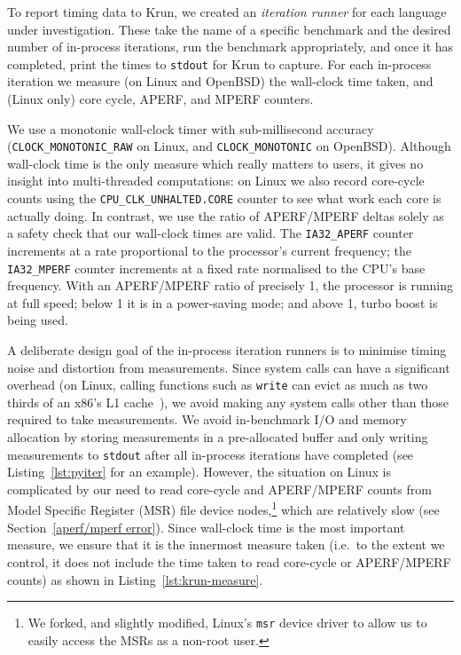\documentclass[acmsmall]{acmart}\settopmatter{printfolios=true}
\newcommand{\krun}{Krun\xspace}
\begin{document}
To report timing data to \krun, we created an
\emph{iteration runner} for each language under investigation.
These take the name of a specific benchmark and
the desired number of in-process iterations, run the benchmark appropriately,
and once it has completed, print the times to \texttt{stdout} for \krun to
capture. For each in-process iteration we
measure (on Linux and OpenBSD) the wall-clock time taken, and (Linux only) core
cycle, APERF, and MPERF counters.

We use a monotonic wall-clock timer with sub-millisecond accuracy
(\texttt{CLOCK\_MONOTONIC\_RAW} on Linux, and \texttt{CLOCK\-\_MONOTONIC} on
OpenBSD). Although wall-clock time is the only measure which really matters to
users, it gives no insight into multi-threaded computations: on Linux we also record
core-cycle counts using the \texttt{CPU\-\_CLK\-\_UNHALTED\-.CORE} counter to see
what work each core is actually doing. In contrast, we use the ratio of APERF/MPERF deltas
solely as a safety check that our wall-clock times are valid.
The \texttt{IA32\_APERF} counter increments at a rate proportional to the
processor's current frequency; the \texttt{IA32\_MPERF} counter increments at a fixed
rate normalised to the CPU's base frequency. With an APERF/MPERF ratio of
precisely 1, the processor is running at full speed; below 1 it is in
a power-saving mode; and above 1, turbo boost is being used.

A deliberate design goal of the in-process iteration runners is to minimise
timing noise and distortion from measurements. Since system calls can have a
significant overhead (on Linux, calling functions such as \texttt{write} can
evict as much as two thirds of an x86's L1 cache~\cite{soares10flexsc}), we
avoid making any system calls other than those required to take measurements. We
avoid in-benchmark I/O and memory allocation by storing measurements in a
pre-allocated buffer and only writing measurements to \texttt{stdout} after all
in-process iterations have completed (see Listing~\ref{lst:pyiter} for an
example). However, the situation on Linux is complicated by our need to read
core-cycle and APERF/MPERF counts from Model Specific Register (MSR) file device
nodes,\footnote{We forked, and slightly modified, Linux's \texttt{msr} device
driver to allow us to easily access the MSRs as a non-root user.} which are relatively
slow (see Section~\ref{aperf/mperf error}). Since wall-clock time
is the most important measure, we ensure that it is the innermost measure taken
(i.e.~to the extent we control, it does not include the time taken to read
core-cycle or APERF/MPERF counts) as shown in Listing~\ref{lst:krun-measure}.
\end{document}
